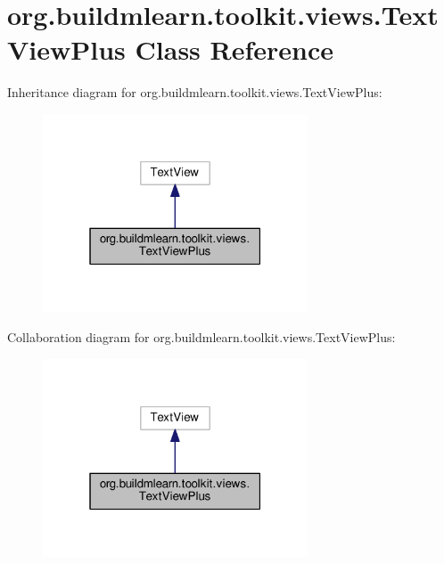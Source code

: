 \hypertarget{classorg_1_1buildmlearn_1_1toolkit_1_1views_1_1TextViewPlus}{}\section{org.\+buildmlearn.\+toolkit.\+views.\+Text\+View\+Plus Class Reference}
\label{classorg_1_1buildmlearn_1_1toolkit_1_1views_1_1TextViewPlus}


Inheritance diagram for org.\+buildmlearn.\+toolkit.\+views.\+Text\+View\+Plus\+:
\nopagebreak
\begin{figure}[H]
\begin{center}
\leavevmode
\includegraphics[width=223pt]{classorg_1_1buildmlearn_1_1toolkit_1_1views_1_1TextViewPlus__inherit__graph}
\end{center}
\end{figure}


Collaboration diagram for org.\+buildmlearn.\+toolkit.\+views.\+Text\+View\+Plus\+:
\nopagebreak
\begin{figure}[H]
\begin{center}
\leavevmode
\includegraphics[width=223pt]{classorg_1_1buildmlearn_1_1toolkit_1_1views_1_1TextViewPlus__coll__graph}
\end{center}
\end{figure}
